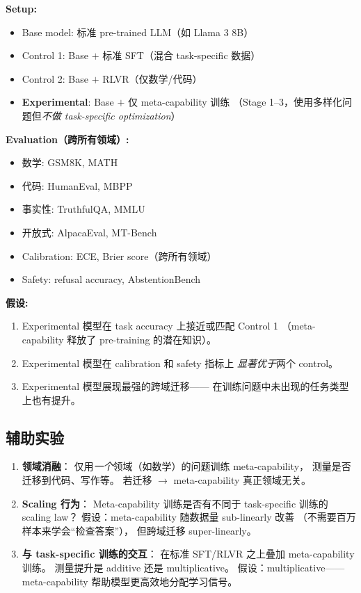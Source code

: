 \documentclass[12pt,a4paper]{article}
\begin{document}
\begin{expbox}
\textbf{Setup:}
\begin{itemize}[leftmargin=1.5em]
  \item Base model: 标准 pre-trained LLM（如 Llama 3 8B）
  \item Control 1: Base $+$ 标准 SFT（混合 task-specific 数据）
  \item Control 2: Base $+$ RLVR（仅数学/代码）
  \item \textbf{Experimental}: Base $+$ 仅 meta-capability 训练
    （Stage 1--3，使用多样化问题但\textit{不做 task-specific optimization}）
\end{itemize}

\textbf{Evaluation（跨所有领域）:}
\begin{itemize}[leftmargin=1.5em]
  \item 数学: GSM8K, MATH
  \item 代码: HumanEval, MBPP
  \item 事实性: TruthfulQA, MMLU
  \item 开放式: AlpacaEval, MT-Bench
  \item Calibration: ECE, Brier score（跨所有领域）
  \item Safety: refusal accuracy, AbstentionBench
\end{itemize}

\textbf{假设:}
\begin{enumerate}[leftmargin=1.5em]
  \item Experimental 模型在 task accuracy 上接近或匹配 Control 1
    （meta-capability 释放了 pre-training 的潜在知识）。
  \item Experimental 模型在 calibration 和 safety 指标上
    \textit{显著优于}两个 control。
  \item Experimental 模型展现最强的跨域迁移——
    在训练问题中未出现的任务类型上也有提升。
\end{enumerate}
\end{expbox}

\subsection{辅助实验}

\begin{enumerate}[leftmargin=2em]
  \item \textbf{领域消融}：
    仅用\textit{一个}领域（如数学）的问题训练 meta-capability，
    测量是否迁移到代码、写作等。
    若迁移 $\rightarrow$ meta-capability 真正领域无关。

  \item \textbf{Scaling 行为}：
    Meta-capability 训练是否有不同于 task-specific 训练的 scaling law？
    假设：meta-capability 随数据量 sub-linearly 改善
    （不需要百万样本来学会``检查答案''），
    但跨域迁移 super-linearly。

  \item \textbf{与 task-specific 训练的交互}：
    在标准 SFT/RLVR 之上叠加 meta-capability 训练。
    测量提升是 additive 还是 multiplicative。
    假设：multiplicative——
    meta-capability 帮助模型更高效地分配学习信号。
\end{enumerate}
\end{document}

